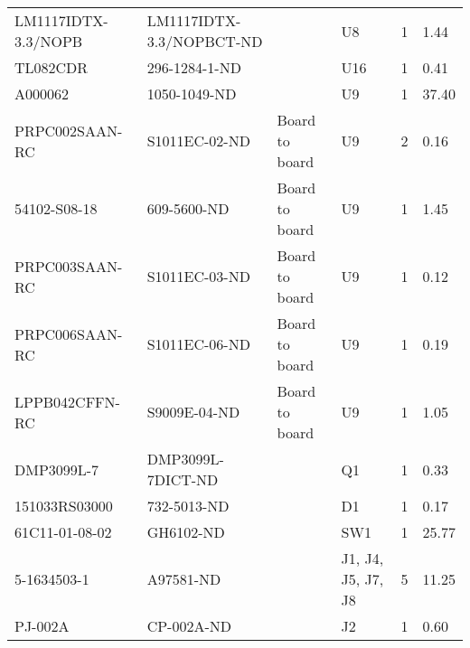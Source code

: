 \begin{tabular}{llllll}
LM1117IDTX-3.3/NOPB      & LM1117IDTX-3.3/NOPBCT-ND &                    & U8                                                                        & 1        & 1.44   \\
TL082CDR                 & 296-1284-1-ND            &                    & U16                                                                       & 1        & 0.41   \\
A000062                  & 1050-1049-ND             &                    & U9                                                                        & 1        & 37.40  \\
PRPC002SAAN-RC           & S1011EC-02-ND            & Board to board     & U9                                                                        & 2        & 0.16   \\
54102-S08-18             & 609-5600-ND              & Board to board     & U9                                                                        & 1        & 1.45   \\
PRPC003SAAN-RC           & S1011EC-03-ND            & Board to board     & U9                                                                        & 1        & 0.12   \\
PRPC006SAAN-RC           & S1011EC-06-ND            & Board to board     & U9                                                                        & 1        & 0.19   \\
LPPB042CFFN-RC           & S9009E-04-ND             & Board to board     & U9                                                                        & 1        & 1.05   \\
DMP3099L-7               & DMP3099L-7DICT-ND        &                    & Q1                                                                        & 1        & 0.33   \\
151033RS03000            & 732-5013-ND              &                    & D1                                                                        & 1        & 0.17   \\
61C11-01-08-02           & GH6102-ND                &                    & SW1                                                                       & 1        & 25.77  \\
5-1634503-1              & A97581-ND                &                    & J1, J4, J5, J7, J8                                                        & 5        & 11.25  \\
PJ-002A                  & CP-002A-ND               &                    & J2                                                                        & 1        & 0.60   \\

\end{tabular}
